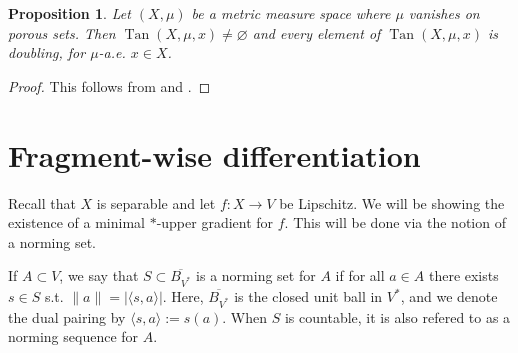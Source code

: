 \documentclass{amsart}
\newtheorem{proposition}[theorem]{Proposition}
\numberwithin{equation}{section}
\newcommand{\Tan}{\operatorname{Tan}}
\begin{document}
\begin{proposition}\label{prop:porous-tangent}
Let $(X,\mu)$ be a metric measure space where $\mu$ vanishes on porous sets. Then $\Tan(X,\mu,x)\ne\varnothing$ and every element of $\Tan(X,\mu,x)$ is doubling, for $\mu$-a.e. $x\in X$.
\end{proposition}
\begin{proof}
    This follows from \cite[Theorem 1.5]{soultaniscakovic} and \cite[Lemma 5.6]{Bate22}.
\end{proof}



\section{Fragment-wise differentiation}\label{sec:fw}

Recall that $X$ is separable and let $f:X\to V$ be Lipschitz. We will be showing the existence of a minimal $\ast$-upper gradient for $f$. This will be done via the notion of a norming set.

If $A\subset V$, we say that $S\subset \overline{B_{V^*}}$ is a norming set for $A$ if for all $a\in A$ there exists $s\in S$ s.t. $\|a\|=|\langle s,a\rangle|$. Here, $\overline{B_{V^*}}$ is the closed unit ball in $V^*$, and we denote the dual pairing by $\langle s,a\rangle:=s(a)$. When $S$ is countable, it is also refered to as a norming sequence for $A$.
\end{document}
